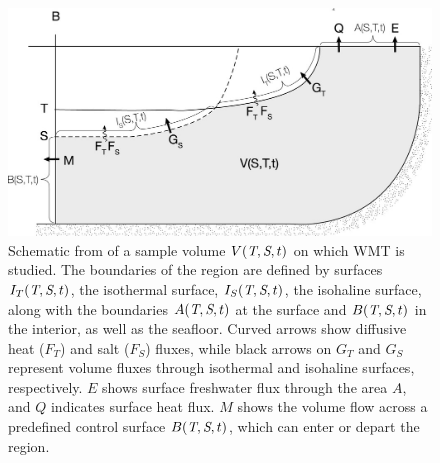 \documentclass[draft]{agujournal2019}
\begin{document}
\begin{figure}
    \includegraphics[width=\linewidth]{figs/pemberton2015_schematic.jpg}
    \vspace{-5pt} %
    \caption{Schematic from  of a sample volume $V(\emph{T},\emph{S},t)$ on which WMT is studied. The boundaries of the region are defined by surfaces $I_T(\emph{T},\emph{S},t)$, the isothermal surface, $I_S(\emph{T},\emph{S},t)$, the isohaline surface, along with the boundaries $A(\emph{T},\emph{S},t)$ at the surface and $B(\emph{T},\emph{S},t)$ in the interior, as well as the seafloor. Curved arrows show diffusive heat ($F_T$) and salt ($F_S$) fluxes, while black arrows on $G_T$ and $G_S$ represent volume fluxes through isothermal and isohaline surfaces, respectively. $E$ shows surface freshwater flux through the area $A$, and $Q$ indicates surface heat flux. $M$ shows the volume flow across a predefined control surface $B(\emph{T},\emph{S},t)$, which can enter or depart the region.}
    \label{fig:pemberton}
    \vspace{-20pt}
\end{figure}
\end{document}
